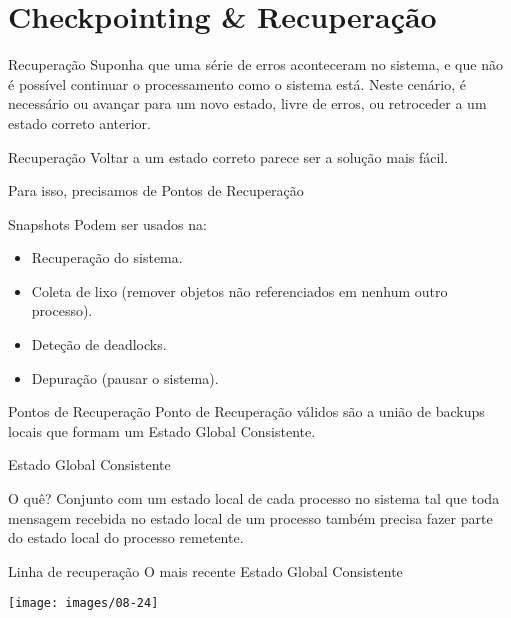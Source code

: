 \section{Checkpointing \& Recuperação}
\begin{frame}{Recuperação}
	Suponha que uma série de erros aconteceram no sistema, e que não é possível continuar o processamento como o sistema está. Neste cenário, é necessário ou avançar para um novo estado, livre de erros, ou retroceder a um estado correto anterior.
\end{frame}

\begin{frame}{Recuperação}
Voltar a um estado correto parece ser a solução mais fácil.

\pause Para isso, precisamos de \alert{Pontos de Recuperação}
\end{frame}

\begin{frame}{Snapshots}
Podem ser usados na:
\begin{itemize}
	\item Recuperação do sistema.
	\item Coleta de lixo (remover objetos não referenciados em nenhum outro processo).
	\item Deteção de deadlocks.
	\item Depuração (pausar o sistema).
\end{itemize}
\end{frame}

\begin{frame}{Pontos de Recuperação}
Ponto de Recuperação válidos são a união de backups locais que formam um \alert{Estado Global Consistente}.
\end{frame}

\begin{frame}{Estado Global Consistente}

\begin{block}{O quê?}
	Conjunto com um estado local de cada processo no sistema tal que toda mensagem recebida no estado local de um processo também precisa fazer parte do estado local do processo remetente.
\end{block}

\begin{block}{Linha de recuperação}
	O mais recente Estado Global Consistente
\end{block}

\texttt{[image: images/08-24]}
\end{frame}


